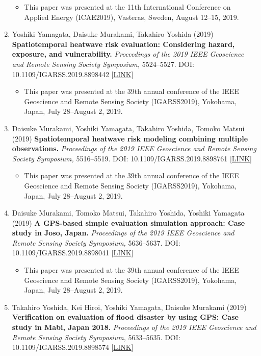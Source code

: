 \documentclass[]{book}
\providecommand{\tightlist}{%
  \setlength{\itemsep}{0pt}\setlength{\parskip}{0pt}}
\begin{document}
\begin{enumerate}
  \begin{itemize}
  \tightlist
  \item
    This paper was presented at the 11th International Conference on Applied Energy (ICAE2019), Vasteras, Sweden, August 12--15, 2019.
  \end{itemize}
\item
  Yoshiki Yamagata, Daisuke Murakami, Takahiro Yoshida (2019)
  \textbf{Spatiotemporal heatwave risk evaluation: Considering hazard, exposure, and vulnerability.}
  \emph{Proceedings of the 2019 IEEE Geoscience and Remote Sensing Society Symposium,} 5524--5527.
  DOI: 10.1109/IGARSS.2019.8898442 {[}\href{https://ieeexplore.ieee.org/document/8898442}{LINK}{]}

  \begin{itemize}
  \tightlist
  \item
    This paper was presented at the 39th annual conference of the IEEE Geoscience and Remote Sensing Society (IGARSS2019), Yokohama, Japan, July 28--August 2, 2019.
  \end{itemize}
\item
  Daisuke Murakami, Yoshiki Yamagata, Takahiro Yoshida, Tomoko Matsui (2019)
  \textbf{Spatiotemporal heatwave risk modeling combining multiple observations.}
  \emph{Proceedings of the 2019 IEEE Geoscience and Remote Sensing Society Symposium,} 5516--5519.
  DOI: 10.1109/IGARSS.2019.8898761 {[}\href{https://ieeexplore.ieee.org/document/8898761}{LINK}{]}

  \begin{itemize}
  \tightlist
  \item
    This paper was presented at the 39th annual conference of the IEEE Geoscience and Remote Sensing Society (IGARSS2019), Yokohama, Japan, July 28--August 2, 2019.
  \end{itemize}
\item
  Daisuke Murakami, Tomoko Matsui, Takahiro Yoshida, Yoshiki Yamagata (2019)
  \textbf{A GPS-based simple evaluation simulation approach: Case study in Joso, Japan.}
  \emph{Proceedings of the 2019 IEEE Geoscience and Remote Sensing Society Symposium,} 5636--5637.
  DOI: 10.1109/IGARSS.2019.8898041 {[}\href{https://ieeexplore.ieee.org/document/8898041}{LINK}{]}

  \begin{itemize}
  \tightlist
  \item
    This paper was presented at the 39th annual conference of the IEEE Geoscience and Remote Sensing Society (IGARSS2019), Yokohama, Japan, July 28--August 2, 2019.
  \end{itemize}
\item
  Takahiro Yoshida, Kei Hiroi, Yoshiki Yamagata, Daisuke Murakami (2019)
  \textbf{Verification on evaluation of flood disaster by using GPS: Case study in Mabi, Japan 2018.}
  \emph{Proceedings of the 2019 IEEE Geoscience and Remote Sensing Society Symposium,} 5633--5635.
  DOI: 10.1109/IGARSS.2019.8898574 {[}\href{https://ieeexplore.ieee.org/document/8898574}{LINK}{]}


\end{enumerate}
\end{document}
